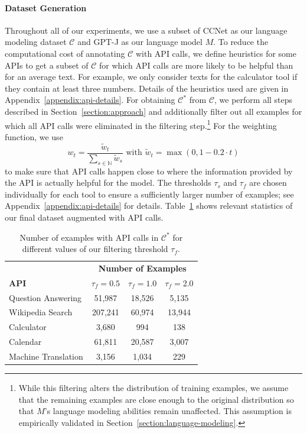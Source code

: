 \documentclass[11pt]{article}
\begin{document}
\begin{CJK*}{UTF8}{gbsn}
\paragraph{Dataset Generation}
Throughout all of our experiments, we use a subset of CCNet \citep{wenzek-etal-2020-ccnet} as our language modeling dataset $\mathcal{C}$ and GPT-J \citep{gpt-j} as our language model $M$. To reduce the computational cost of annotating $\mathcal{C}$ with API calls, we define heuristics for some APIs to get a subset of $\mathcal{C}$ for which API calls are more likely to be helpful than for an average text. For example, we only consider texts for the calculator tool if they contain at least three numbers.  Details of the heuristics used are given in Appendix~\ref{appendix:api-details}. For obtaining $\mathcal{C}^*$ from $\mathcal{C}$, we perform all steps described in Section~\ref{section:approach} and additionally filter out all examples for which all API calls were eliminated in the filtering step.\footnote{While this filtering alters the distribution of training examples, we assume that the remaining examples are close enough to the original distribution so that $M$'s language modeling abilities remain unaffected. This assumption is empirically validated in Section~\ref{section:language-modeling}.} For the weighting function, we use 
\[
w_t  = \frac{\tilde{w}_t}{ \sum_{s \in \mathbb{N}} \tilde{w}_s} \text{ with }
\tilde{w}_t = \max(0, 1 - 0.2 \cdot t)
\]
to make sure that API calls happen close to where the information provided by the API is actually helpful for the model. The thresholds $\tau_s$ and $\tau_f$ are chosen individually for each tool to ensure a sufficiently larger number of examples; see Appendix~\ref{appendix:api-details} for details.
Table~\ref{tab:c_star} shows relevant statistics of our final dataset augmented with API calls. 

\begin{table}
    \centering
    \small
    \setlength{\tabcolsep}{5pt}
    \begin{tabularx}{\linewidth}{Xccc}
         \toprule
         & \multicolumn{3}{c}{\textbf{Number of Examples}} \\
         \textbf{API} & $\tau_f = 0.5$ & $\tau_f = 1.0$ & $\tau_f = 2.0$ \\
         \midrule
         Question Answering & \phantom{0}51,987 & \phantom{0}18,526 & \phantom{00}5,135 \\
         Wikipedia Search & 207,241 & \phantom{0}60,974 & \phantom{0}13,944 \\
         Calculator & \phantom{00}3,680 & \phantom{000,}994 & \phantom{000,}138 \\
         Calendar & \phantom{0}61,811 & \phantom{0}20,587 & \phantom{00}3,007 \\
         Machine Translation & \phantom{00}3,156 & \phantom{00}1,034 &  \phantom{000,}229 \\
         \bottomrule
    \end{tabularx}
    \caption{Number of examples with API calls in $\mathcal{C}^*$ for different values of our filtering threshold $\tau_f$.}
    \label{tab:c_star}
\end{table}


\end{CJK*}
\end{document}
